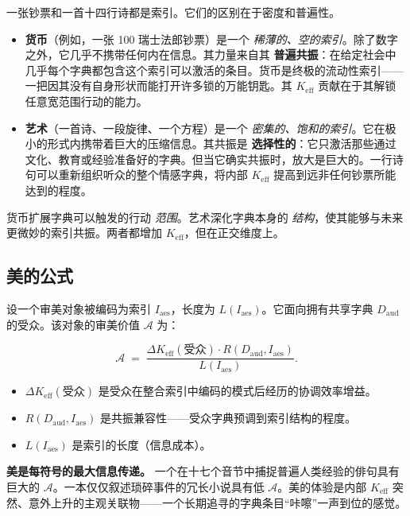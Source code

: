 \documentclass[12pt,a4paper]{article}
\newcommand{\Keff}{K_{\mathrm{eff}}}
\begin{document}
	一张钞票和一首十四行诗都是索引。它们的区别在于密度和普遍性。
	
	\begin{itemize}[leftmargin=*]
		\item \textbf{货币}（例如，一张 100 瑞士法郎钞票）是一个 \emph{稀薄的、空的索引}。除了数字之外，它几乎不携带任何内在信息。其力量来自其 \textbf{普遍共振}：在给定社会中几乎每个字典都包含这个索引可以激活的条目。货币是终极的流动性索引——一把因其没有自身形状而能打开许多锁的万能钥匙。其 \(K_{\mathrm{eff}}\) 贡献在于其解锁任意宽范围行动的能力。
		\item \textbf{艺术}（一首诗、一段旋律、一个方程）是一个 \emph{密集的、饱和的索引}。它在极小的形式内携带着巨大的压缩信息。其共振是 \textbf{选择性的}：它只激活那些通过文化、教育或经验准备好的字典。但当它确实共振时，放大是巨大的。一行诗句可以重新组织听众的整个情感字典，将内部 \(K_{\mathrm{eff}}\) 提高到远非任何钞票所能达到的程度。
	\end{itemize}
	
	货币扩展字典可以触发的行动 \emph{范围}。艺术深化字典本身的 \emph{结构}，使其能够与未来更微妙的索引共振。两者都增加 \(K_{\mathrm{eff}}\)，但在正交维度上。
	
	\subsection{美的公式}
	
	设一个审美对象被编码为索引 \(I_{\mathrm{aes}}\)，长度为 \(L(I_{\mathrm{aes}})\)。它面向拥有共享字典 \(D_{\mathrm{aud}}\) 的受众。该对象的审美价值 \(\mathcal{A}\) 为：
	
	\[
	\mathcal{A} \; = \; \frac{\Delta\Keff(\text{受众}) \cdot R(D_{\mathrm{aud}}, I_{\mathrm{aes}})}{L(I_{\mathrm{aes}})}.
	\]
	
	\begin{itemize}[leftmargin=*]
		\item $\Delta\Keff(\text{受众})$ 是受众在整合索引中编码的模式后经历的协调效率增益。
		\item $R(D_{\mathrm{aud}}, I_{\mathrm{aes}})$ 是共振兼容性——受众字典预调到索引结构的程度。
		\item $L(I_{\mathrm{aes}})$ 是索引的长度（信息成本）。
	\end{itemize}
	
	\textbf{美是每符号的最大信息传递。} 一个在十七个音节中捕捉普遍人类经验的俳句具有巨大的 \(\mathcal{A}\)。一本仅仅叙述琐碎事件的冗长小说具有低 \(\mathcal{A}\)。美的体验是内部 \(K_{\mathrm{eff}}\) 突然、意外上升的主观关联物——一个长期追寻的字典条目“咔嚓”一声到位的感觉。
	
\end{document}
